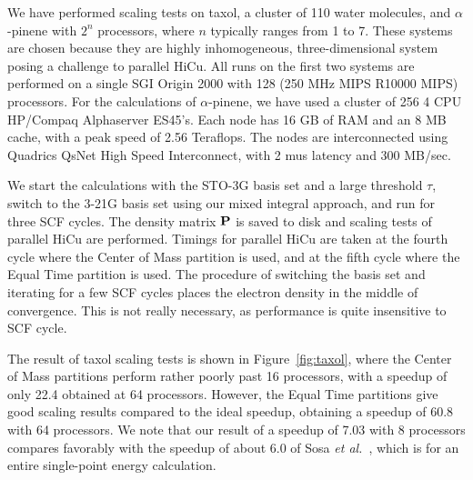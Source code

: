 \commentoutA{\documentclass[prl,aps,twocolumn,showpacs,twocolumngrid,superbib]{revtex4}}
\begin{document}
We have performed scaling tests on taxol, a cluster of 110 water
molecules, and $\alpha$-pinene 
with $2^n$ processors, where $n$ typically ranges from 1 to
7.  These systems are chosen because they are highly inhomogeneous,
three-dimensional system posing a challenge to parallel HiCu.  
All runs on the first two systems are performed on a single SGI Origin 2000
with 128 (250 MHz MIPS R10000 MIPS) processors. 
For the calculations of $\alpha$-pinene, we have used
a cluster of 256 4 CPU HP/Compaq Alphaserver ES45's.
Each node has 16 GB of RAM and an 8 MB cache, with a peak
speed of 2.56 Teraflops. The nodes are interconnected using
Quadrics QsNet High Speed Interconnect, with 2 mus latency and 300 MB/sec.

We start the calculations with the STO-3G basis set and a large 
threshold $\tau$, switch to the 3-21G basis set using our mixed
integral approach, and run for three SCF cycles.  The density matrix
${\bf P}$ is saved to disk and scaling tests of parallel HiCu are
performed.  Timings for parallel HiCu are taken at the fourth cycle where the
Center of Mass partition is used, and at the fifth cycle where the
Equal Time partition is used. The procedure of switching the basis set and 
iterating for a few SCF cycles places the electron density in the middle 
of convergence.  This is not really necessary, as performance is quite 
insensitive to SCF cycle.  


The result of taxol scaling tests is shown in Figure~\ref{fig:taxol},
where the Center of Mass partitions perform rather poorly past 16 processors, with
a speedup of only 22.4 obtained at 64 processors.  However, the Equal
Time partitions give good scaling results compared to the ideal
speedup, obtaining a speedup of 60.8 with 64 processors.  We note that
our result of a speedup of 7.03 with 8 processors compares favorably
with the speedup of about 6.0 of Sosa {\it et al.}~\cite{Sosa_00v26},
which is for an entire single-point energy calculation.
\end{document}
